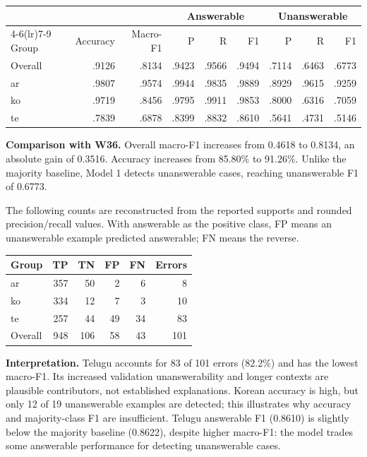 \documentclass[11pt,a4paper]{article}
\begin{document}
\begin{center}
\small
\begin{tabular}{lrrrrrrrr}
\toprule
& & & \multicolumn{3}{c}{Answerable} & \multicolumn{3}{c}{Unanswerable} \\
\cmidrule(lr){4-6}\cmidrule(lr){7-9}
Group & Accuracy & Macro-F1 & P & R & F1 & P & R & F1 \\
\midrule
Overall & .9126 & .8134 & .9423 & .9566 & .9494 & .7114 & .6463 & .6773 \\
ar & .9807 & .9574 & .9944 & .9835 & .9889 & .8929 & .9615 & .9259 \\
ko & .9719 & .8456 & .9795 & .9911 & .9853 & .8000 & .6316 & .7059 \\
te & .7839 & .6878 & .8399 & .8832 & .8610 & .5641 & .4731 & .5146 \\
\bottomrule
\end{tabular}
\end{center}

\textbf{Comparison with W36.} Overall macro-F1 increases from 0.4618 to 0.8134, an absolute gain of 0.3516. Accuracy increases from 85.80\% to 91.26\%. Unlike the majority baseline, Model 1 detects unanswerable cases, reaching unanswerable F1 of 0.6773.

The following counts are reconstructed from the reported supports and rounded precision/recall values. With answerable as the positive class, FP means an unanswerable example predicted answerable; FN means the reverse.
\begin{center}
\begin{tabular}{lrrrrr}
\toprule
Group & TP & TN & FP & FN & Errors \\
\midrule
ar & 357 & 50 & 2 & 6 & 8 \\
ko & 334 & 12 & 7 & 3 & 10 \\
te & 257 & 44 & 49 & 34 & 83 \\
\midrule
Overall & 948 & 106 & 58 & 43 & 101 \\
\bottomrule
\end{tabular}
\end{center}

\textbf{Interpretation.} Telugu accounts for 83 of 101 errors (82.2\%) and has the lowest macro-F1. Its increased validation unanswerability and longer contexts are plausible contributors, not established explanations. Korean accuracy is high, but only 12 of 19 unanswerable examples are detected; this illustrates why accuracy and majority-class F1 are insufficient. Telugu answerable F1 (0.8610) is slightly below the majority baseline (0.8622), despite higher macro-F1: the model trades some answerable performance for detecting unanswerable cases.
\end{document}
